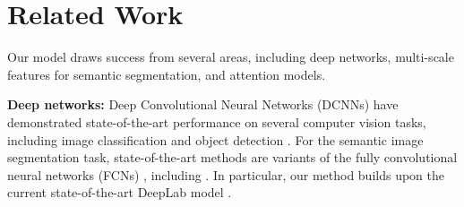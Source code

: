 \section{Related Work}
Our model draws success from several areas, including deep networks, multi-scale features for semantic segmentation, and attention models.

\textbf{Deep networks:} Deep Convolutional Neural Networks (DCNNs) \cite{lecun1998gradient} have demonstrated state-of-the-art performance on several computer vision tasks, including image classification \cite{krizhevsky2012imagenet, sermanet2013overfeat, szegedy2014going, simonyan2014very, papandreou2014untangling} and object detection \cite{girshick2014rich, he2014spatial}. For the semantic image segmentation task, state-of-the-art methods are variants of the fully convolutional
neural networks (FCNs) \cite{long2014fully}, including \cite{chen2014semantic, dai2015boxsup, lin2015efficient, noh2015learning, zheng2015conditional}. In particular, our method builds upon the current state-of-the-art DeepLab model \cite{chen2014semantic}. %

